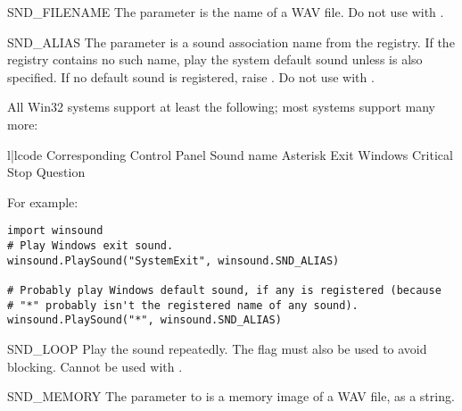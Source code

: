 \begin{datadesc}{SND_FILENAME}
  The  parameter is the name of a WAV file.
  Do not use with .
\end{datadesc}

\begin{datadesc}{SND_ALIAS}
  The  parameter is a sound association name from the
  registry.  If the registry contains no such name, play the system
  default sound unless  is also specified.
  If no default sound is registered, raise .
  Do not use with .

  All Win32 systems support at least the following; most systems support
  many more:

\begin{tableii}{l|l}{code}
               { }
               {Corresponding Control Panel Sound name}
     {Asterisk}
         {Exit Windows}
         {Critical Stop}
     {Question}
\end{tableii}

  For example:

\begin{verbatim}
import winsound
# Play Windows exit sound.
winsound.PlaySound("SystemExit", winsound.SND_ALIAS)

# Probably play Windows default sound, if any is registered (because
# "*" probably isn't the registered name of any sound).
winsound.PlaySound("*", winsound.SND_ALIAS)
\end{verbatim}
\end{datadesc}

\begin{datadesc}{SND_LOOP}
  Play the sound repeatedly.  The  flag must also
  be used to avoid blocking.  Cannot be used with .
\end{datadesc}

\begin{datadesc}{SND_MEMORY}
  The  parameter to  is a memory
  image of a WAV file, as a string.

\end{datadesc}

